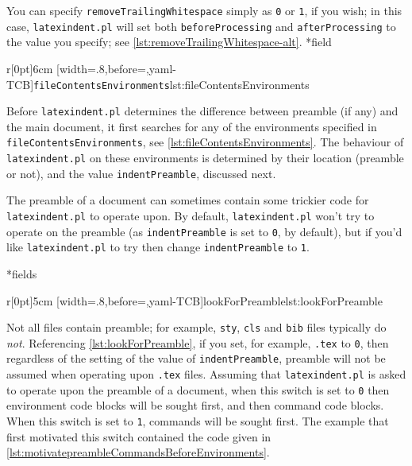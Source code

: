 	You can specify \texttt{removeTrailingWhitespace} simply as \texttt{0} or \texttt{1}, if you wish; in this case,%
	 \texttt{latexindent.pl} will set both \texttt{beforeProcessing} and \texttt{afterProcessing} to the value you specify; see \cref{lst:removeTrailingWhitespace-alt}.
*{field}

	\begin{wrapfigure}[6]{r}[0pt]{6cm}
		[width=.8\linewidth,before=\centering,yaml-TCB]{\texttt{fileContentsEnvironments}}{lst:fileContentsEnvironments}
	\end{wrapfigure}
	Before \texttt{latexindent.pl} determines the difference between preamble (if any) and the main document, it first searches for any of the environments specified in \texttt{fileContentsEnvironments}, see \cref{lst:fileContentsEnvironments}.
	The behaviour of \texttt{latexindent.pl} on these environments is determined by their location (preamble or not), and the value \texttt{indentPreamble}, discussed next.


	The preamble of a document can sometimes contain some trickier code for \texttt{latexindent.pl} to operate upon.
	By default, \texttt{latexindent.pl} won't try to operate on the preamble (as \texttt{indentPreamble} is set to \texttt{0}, by default), but if you'd like \texttt{latexindent.pl} to try then change \texttt{indentPreamble} to \texttt{1}.

*{fields}

	\begin{wrapfigure}[8]{r}[0pt]{5cm}
		[width=.8\linewidth,before=\centering,yaml-TCB]{lookForPreamble}{lst:lookForPreamble}
	\end{wrapfigure}
	Not all files contain preamble; for example, \texttt{sty}, \texttt{cls} and \texttt{bib} files typically do \emph{not}.
	Referencing \cref{lst:lookForPreamble}, if you set, for example, \texttt{.tex} to \texttt{0}, then regardless of the setting of the value of \texttt{indentPreamble}, preamble will not be assumed when operating upon \texttt{.tex} files.
	Assuming that \texttt{latexindent.pl} is asked to operate upon the preamble of a document, when this switch is set to \texttt{0} then environment code blocks will be sought first, and then command code blocks.
	When this switch is set to \texttt{1}, commands will be sought first.
	The example that first motivated this switch contained the code given in \cref{lst:motivatepreambleCommandsBeforeEnvironments}.

